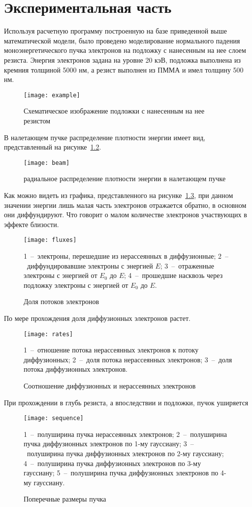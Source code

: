 \chapter{Экспериментальная часть}
Используя расчетную программу построенную на базе приведенной выше математической модели, было проведено моделирование нормального падения моноэнергетического пучка электронов на подложку с нанесенным на нее слоем резиста. Энергия электронов задана на уровне 20 кэВ, подложка выполнена из кремния толщиной 5000 нм, а резист выполнен из ПММА и имел толщину 500 нм.

\begin{figure}[h]
    \center
    \texttt{[image: example]}
    \caption{Схематическое изображение подложки с нанесенным на нее резистом}
    \label{fig:example}
\end{figure}
В налетающем пучке распределение плотности энергии имеет вид, представленный на рисунке~\ref{fig:beam}.
\begin{figure}[h]
    \center
    \texttt{[image: beam]}
    \caption{радиальное распределение плотности энергии в налетающем пучке}
    \label{fig:beam}
\end{figure}
Как можно видеть из графика, представленного на рисунке~\ref{fig:fluxes}, при данном значении энергии лишь малая часть электронов отражается обратно, в основном они диффундируют. Что говорит о малом количестве электронов участвующих в эффекте близости.
\begin{figure}[h]
    \center
    \texttt{[image: fluxes]}
    \parbox[t]{.7\textwidth}{\small
    1~--~электроны, перешедшие из нерассеянных в диффузионные;
2~--~диффундировавшие электроны с энергией $E$;
3~--~отраженные электроны с энергией от $E_0$ до $E$;
4~--~прошедшие насквозь через подложку электроны с энергией от $E_0$ до $E$.}
    \caption{Доля потоков электронов}
    \label{fig:fluxes}
\end{figure}
По мере прохождения доля диффузионных электронов растет.
\begin{figure}[h]
    \center
    \texttt{[image: rates]}
    \parbox[t]{.7\textwidth}{\small
    1~--~отношение потока нерассеянных электронов к потоку диффузионных;
2~--~доля потока нерассеянных электронов;
3~--~доля потока диффузионных электронов.}
    \caption{Соотношение диффузионных и нерассеянных электронов}
    \label{fig:rates}
\end{figure}
При прохождении в глубь резиста, а впоследствии и подложки, пучок уширяется
\begin{figure}[h]
    \center
    \texttt{[image: sequence]}
    \parbox[t]{.7\textwidth}{\small
    1~--~полуширина пучка нерассеянных электронов;
2~--~полуширина пучка диффузионных электронов по 1-му гауссиану;
3~--~полуширина пучка диффузионных электронов по 2-му гауссиану;
4~--~полуширина пучка диффузионных электронов по 3-му гауссиану;
5~--~полуширина пучка диффузионных электронов по 4-му гауссиану.}
    \caption{Поперечные размеры пучка}
    \label{fig:sequence}
\end{figure}

